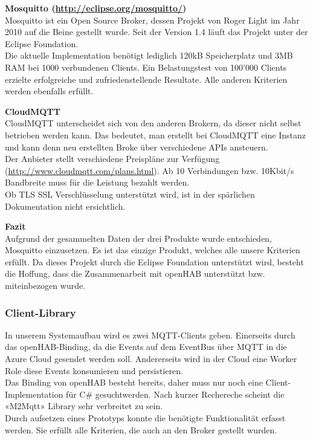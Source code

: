 \textbf{Mosquitto (\url{http://eclipse.org/mosquitto/})}\\
Mosquitto ist ein Open Source Broker, dessen Projekt von Roger Light im Jahr 2010 auf die Beine gestellt wurde. Seit der Version 1.4 läuft das Projekt unter der Eclipse Foundation. \\
Die aktuelle Implementation benötigt lediglich 120kB Speicherplatz und 3MB RAM bei 1000 verbundenen Clients. Ein Belastungstest von 100'000 Clients erzielte erfolgreiche und zufriedenstellende Resultate.
Alle anderen Kriterien werden ebenfalls erfüllt.

\textbf{CloudMQTT} \\
CloudMQTT unterscheidet sich von den anderen Brokern, da dieser nicht selbst betrieben werden kann. Das bedeutet, man erstellt bei CloudMQTT eine Instanz und kann denn neu erstellten Broke über verschiedene APIs ansteuern. \\
Der Anbieter stellt verschiedene Preispläne zur Verfügung (\url{http://www.cloudmqtt.com/plans.html}). Ab 10 Verbindungen bzw. 10Kbit/s Bandbreite muss für die Leistung bezahlt werden. \\
Ob TLS SSL Verschlüsselung unterstützt wird, ist in der spärlichen Dokumentation nicht ersichtlich.

\textbf{Fazit} \\
Aufgrund der gesammelten Daten der drei Produkte wurde entschieden, Mosquitto einzusetzen. Es ist das einzige Produkt, welches alle unsere Kriterien erfüllt. Da dieses Projekt durch die Eclipse Foundation unterstützt wird, besteht die Hoffung, dass die Zusammenarbeit mit openHAB unterstützt bzw. miteinbezogen wurde.

\subsubsection{Client-Library}
In unserem Systemaufbau wird es zwei MQTT-Clients geben. Einerseits durch das openHAB-Binding, da die Events auf dem EventBus über MQTT in die Azure Cloud gesendet werden soll. Andererseits wird in der Cloud eine Worker Role diese Events konsumieren und persistieren. \\
Das Binding von openHAB besteht bereits, daher muss nur noch eine Client-Implementation für C\# gesuchtwerden. Nach kurzer Rechereche scheint die «M2Mqtt» Library sehr verbreitet zu sein. \\
Durch aufsetzen eines Prototyps konnte die benötigte Funktionalität erfasst werden. Sie erfüllt alle Kriterien, die auch an den Broker gestellt wurden.

